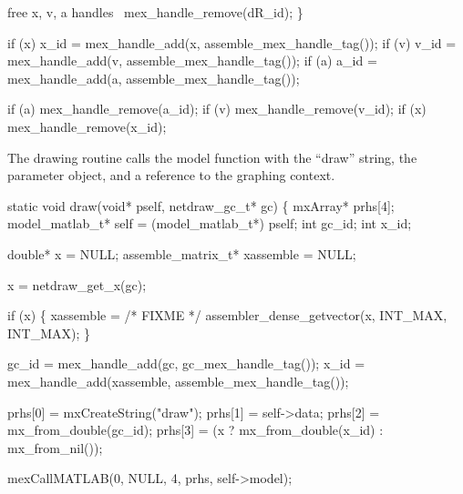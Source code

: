     \LA{}free x, v, a handles~{\nwtagstyle{}}\RA{}
    mex_handle_remove(dR_id);
\}

\nwendcode{}\nwdocspar

\nwenddocs{}\endmoddef
if (x) x_id = mex_handle_add(x, assemble_mex_handle_tag());
if (v) v_id = mex_handle_add(v, assemble_mex_handle_tag());
if (a) a_id = mex_handle_add(a, assemble_mex_handle_tag());
\nwendcode{}\nwdocspar

\nwenddocs{}\endmoddef
if (a) mex_handle_remove(a_id);
if (v) mex_handle_remove(v_id);
if (x) mex_handle_remove(x_id);
\nwendcode{}\nwdocspar


The drawing routine calls the model function with the ``draw''
string, the parameter object, and a reference to the graphing
context.

\nwenddocs{}\plusendmoddef
static void draw(void* pself, netdraw_gc_t* gc)
\{
    mxArray* prhs[4];
    model_matlab_t* self = (model_matlab_t*) pself;
    int gc_id;
    int x_id;

    double* x = NULL;
    assemble_matrix_t* xassemble = NULL;

    x = netdraw_get_x(gc);

    if (x) \{
        xassemble = /* FIXME */
            assembler_dense_getvector(x, INT_MAX, INT_MAX);
    \}

    gc_id = mex_handle_add(gc, gc_mex_handle_tag());
    x_id  = mex_handle_add(xassemble, assemble_mex_handle_tag());

    prhs[0] = mxCreateString("draw");
    prhs[1] = self->data;
    prhs[2] = mx_from_double(gc_id);
    prhs[3] = (x ? mx_from_double(x_id) : mx_from_nil());

    mexCallMATLAB(0, NULL, 4, prhs, self->model); 


